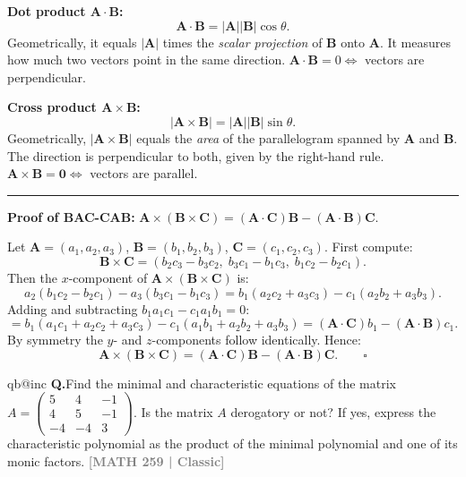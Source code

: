 \documentclass[12pt,a3paper]{article}
\makeatletter
\newcommand{\yr}[1]{\hfill\textcolor{gray}{\small\textbf{[#1]}}}
\newcounter{qnum}
\newcommand{\Q}[1]{%
  \csname qb@inc\endcsname
  \needspace{4\baselineskip}
  \refstepcounter{qnum}
  \vspace{6pt}
  \noindent\textbf{Q\theqnum.}\enspace #1\par
}
\makeatother
\begin{document}
\begin{tcolorbox}[enhanced,breakable,
  colback=cA!4,colframe=cA,boxrule=0.8pt,arc=5pt,
  title={\textbf{Answer --- Geometry of Dot/Cross Product; BAC-CAB Rule}},
  fonttitle=\bfseries\color{white},colbacktitle=cA]
 
\textbf{Dot product $\mathbf{A}\cdot\mathbf{B}$:}
\[
  \mathbf{A}\cdot\mathbf{B} = |\mathbf{A}||\mathbf{B}|\cos\theta.
\]
Geometrically, it equals $|\mathbf{A}|$ times the \emph{scalar projection} of $\mathbf{B}$ onto $\mathbf{A}$.
It measures how much two vectors point in the same direction.
$\mathbf{A}\cdot\mathbf{B}=0 \Leftrightarrow$ vectors are perpendicular.
 
\textbf{Cross product $\mathbf{A}\times\mathbf{B}$:}
\[
  |\mathbf{A}\times\mathbf{B}| = |\mathbf{A}||\mathbf{B}|\sin\theta.
\]
Geometrically, $|\mathbf{A}\times\mathbf{B}|$ equals the \emph{area} of the parallelogram spanned by $\mathbf{A}$ and $\mathbf{B}$.
The direction is perpendicular to both, given by the right-hand rule.
$\mathbf{A}\times\mathbf{B}=\mathbf{0} \Leftrightarrow$ vectors are parallel.
 
\medskip
\textcolor{cA}{\rule{\textwidth}{0.4pt}}
 
\textbf{Proof of BAC-CAB:} $\mathbf{A}\times(\mathbf{B}\times\mathbf{C}) = (\mathbf{A}\cdot\mathbf{C})\mathbf{B} - (\mathbf{A}\cdot\mathbf{B})\mathbf{C}$.
 
Let $\mathbf{A}=(a_1,a_2,a_3)$, $\mathbf{B}=(b_1,b_2,b_3)$, $\mathbf{C}=(c_1,c_2,c_3)$. First compute:
\[
\mathbf{B}\times\mathbf{C} = (b_2c_3-b_3c_2,\;b_3c_1-b_1c_3,\;b_1c_2-b_2c_1).
\]
Then the $x$-component of $\mathbf{A}\times(\mathbf{B}\times\mathbf{C})$ is:
\[
a_2(b_1c_2-b_2c_1) - a_3(b_3c_1-b_1c_3)
= b_1(a_2c_2+a_3c_3) - c_1(a_2b_2+a_3b_3).
\]
Adding and subtracting $b_1 a_1 c_1 - c_1 a_1 b_1 = 0$:
\[
= b_1(a_1c_1+a_2c_2+a_3c_3) - c_1(a_1b_1+a_2b_2+a_3b_3)
= (\mathbf{A}\cdot\mathbf{C})b_1 - (\mathbf{A}\cdot\mathbf{B})c_1.
\]
By symmetry the $y$- and $z$-components follow identically. Hence:
\[
  \mathbf{A}\times(\mathbf{B}\times\mathbf{C}) = (\mathbf{A}\cdot\mathbf{C})\mathbf{B} - (\mathbf{A}\cdot\mathbf{B})\mathbf{C}. \qquad\square
\]
 
\end{tcolorbox}
 
 

\Q{Find the minimal and characteristic equations of the matrix $A = \begin{pmatrix} 5 & 4 & -1 \\ 4 & 5 & -1 \\ -4 & -4 & 3 \end{pmatrix}$. Is the matrix $A$ derogatory or not? If yes, express the characteristic polynomial as the product of the minimal polynomial and one of its monic factors.
\yr{MATH 259 | Classic}}
\end{document}
